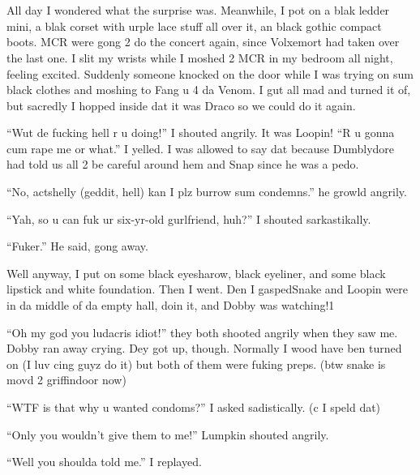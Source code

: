 \section{\chaptername~\thesection}



All day I wondered what the surprise was. Meanwhile, I pot on a blak ledder mini, a blak corset with urple lace stuff all over it, an black gothic compact boots. MCR were gong 2 do the concert again, since Volxemort had taken over the last one. I slit my wrists while I moshed 2 MCR in my bedroom all night, feeling excited. Suddenly someone knocked on the door while I was trying on sum black clothes and moshing to Fang u 4 da Venom. I gut all mad and turned it of, but sacredly I hopped inside dat it was Draco so we could do it again.

\enquote{Wut de fucking hell r u doing!} I shouted angrily. It was Loopin! \enquote{R u gonna cum rape me or what.} I yelled. I was allowed to say dat because Dumblydore had told us all 2 be careful around hem and Snap since he was a pedo.

\enquote{No, actshelly (geddit, hell) kan I plz burrow sum condemns.} he growld angrily.

\enquote{Yah, so u can fuk ur six-yr-old gurlfriend, huh?} I shouted sarkastikally.

\enquote{Fuker.} He said, gong away.

Well anyway, I put on some black eyesharow, black eyeliner, and some black lipstick and white foundation. Then I went. Den I gasped\dotfill\newline Snake and Loopin were in da middle of da empty hall, doin it, and Dobby was watching!1

\enquote{Oh my god you ludacris idiot!} they both shooted angrily when they saw me. Dobby ran away crying. Dey got up, though. Normally I wood have ben turned on (I luv cing guyz do it) but both of them were fuking preps. (btw snake is movd 2 griffindoor now)

\enquote{WTF is that why u wanted condoms?} I asked sadistically. (c I speld dat)

\enquote{Only you wouldn't give them to me!} Lumpkin shouted angrily.

\enquote{Well you shoulda told me.} I replayed.

